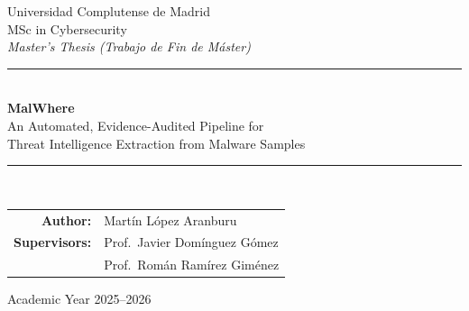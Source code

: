 \documentclass[11pt,a4paper]{article}
\begin{document}
\begin{titlepage}
\centering
\vspace*{1.5cm}

{\large Universidad Complutense de Madrid}\\[0.2cm]
{\normalsize MSc in Cybersecurity}\\[1.5cm]

{\large \textit{Master's Thesis (Trabajo de Fin de M\'aster)}}\\[1cm]

\rule{\linewidth}{0.5pt}\\[0.4cm]
{\Huge \bfseries MalWhere}\\[0.3cm]
{\Large An Automated, Evidence-Audited Pipeline for\\ Threat Intelligence Extraction from Malware Samples}\\[0.4cm]
\rule{\linewidth}{0.5pt}\\[1.5cm]

\begin{tabular}{rl}
\textbf{Author:} & Mart\'in L\'opez Aranburu \\[0.3cm]
\textbf{Supervisors:} & Prof.\ Javier Dom\'inguez G\'omez \\
                       & Prof.\ Rom\'an Ram\'irez Gim\'enez \\
\end{tabular}

\vfill

{\normalsize Academic Year 2025--2026}

\end{titlepage}

\newpage
\tableofcontents
\newpage



\clearpage

\clearpage

\clearpage

\clearpage

\clearpage

\clearpage

\clearpage

\clearpage


\clearpage
{}


\appendix
\clearpage

\end{document}
